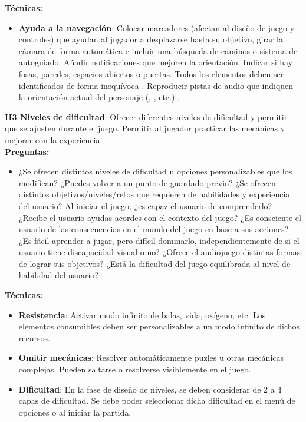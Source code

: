 \textbf{Técnicas:}
\begin{itemize}
	\item \textbf{Ayuda a la navegación}: Colocar marcadores (afectan al diseño de juego y controles) que ayudan al jugador a desplazarse hasta su objetivo, girar la cámara de forma automática e incluir una búsqueda de caminos o sistema de autoguiado. Añadir notificaciones que mejoren la orientación. Indicar si hay fosas, paredes, espacios abiertos o puertas. Todos los elementos deben ser identificados de forma inequívoca \cite{LibroBlancoAccesibilidad} . Reproducir pistas de audio que indiquen la orientación actual del personaje (, , etc.) \cite{araujoMobileAudioGames2017a}.
\end{itemize}
	\textbf{H3 Niveles de dificultad}: Ofrecer diferentes niveles de dificultad y permitir que se ajusten durante el juego. Permitir al jugador practicar las mecánicas y mejorar con la experiencia. \cite{falkEngagingGameplayAudio2020} \cite{araujoMobileAudioGames2017a} \cite{deborbacamposUsabilityAccessibilityGameplay2016} \cite{jimenezhurtadoDimensionsSubdimensionsEQUIT2025} \cite{teixeiraborgesFairPlayGuidelines2018a}\\
\textbf{Preguntas:}
\begin{itemize}
	\item ¿Se ofrecen distintos niveles de dificultad u opciones personalizables que los modifican? ¿Puedes volver a un punto de guardado previo? ¿Se ofrecen distintos objetivos/niveles/retos que requieren de habilidades y experiencia del usuario? Al iniciar el juego, ¿es capaz el usuario de comprenderlo? ¿Recibe el usuario ayudas acordes con el contexto del juego? ¿Es consciente el usuario de las consecuencias en el mundo del juego en base a sus acciones? ¿Es fácil aprender a jugar, pero difícil dominarlo, independientemente de si el usuario tiene discapacidad visual o no? ¿Ofrece el audiojuego distintas formas de lograr sus objetivos? ¿Está la dificultad del juego equilibrada al nivel de habilidad del usuario?
\end{itemize}
\textbf{Técnicas:}
\begin{itemize}
	\item \textbf{Resistencia}: Activar modo infinito de balas, vida, oxígeno, etc. Los elementos consumibles deben ser personalizables a un modo infinito de dichos recursos. \cite{LibroBlancoAccesibilidad}
	\item \textbf{Omitir mecánicas}: Resolver automáticamente puzles u otras mecánicas complejas. Pueden saltarse o resolverse visiblemente en el juego. \cite{LibroBlancoAccesibilidad}
	\item \textbf{Dificultad}: En la fase de diseño de niveles, se deben considerar de 2 a 4 capas de dificultad. Se debe poder seleccionar dicha dificultad en el menú de opciones o al iniciar la partida. \cite{LibroBlancoAccesibilidad} 
\end{itemize}
